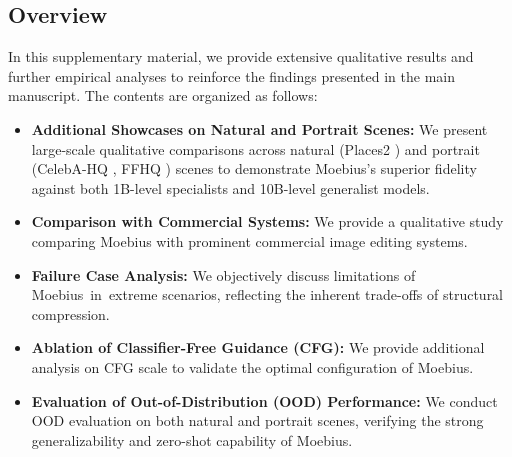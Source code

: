 \documentclass{llmxive}
\begin{document}
\subsection*{Overview}
In this supplementary material, we provide extensive qualitative results and further empirical analyses to reinforce the findings presented in the main manuscript. The contents are organized as follows:
\begin{itemize}
    \item \textbf{Additional Showcases on Natural and Portrait Scenes:} We present large-scale qualitative comparisons across natural (Places2 \cite{zhou2017places}) and portrait (CelebA-HQ \cite{karras2018celebahq}, FFHQ \cite{karras2018stylegan_ffhq}) scenes to demonstrate Moebius's superior fidelity against both 1B-level specialists and 10B-level generalist models.
    \item \textbf{Comparison with Commercial Systems:} We provide a qualitative study comparing Moebius with prominent commercial image editing systems.
    \item \textbf{Failure Case Analysis:} We objectively discuss limitations of Moebius~in~extreme scenarios, reflecting the inherent trade-offs of structural compression.
    \item \textbf{Ablation of Classifier-Free Guidance (CFG):} We provide additional analysis on CFG \cite{ho2022CFG} scale to validate the optimal configuration of Moebius.
    \item \textbf{Evaluation of Out-of-Distribution (OOD) Performance:} We conduct OOD evaluation on both natural and portrait scenes, verifying the strong generalizability and zero-shot capability of Moebius.
\end{itemize}

\end{document}
